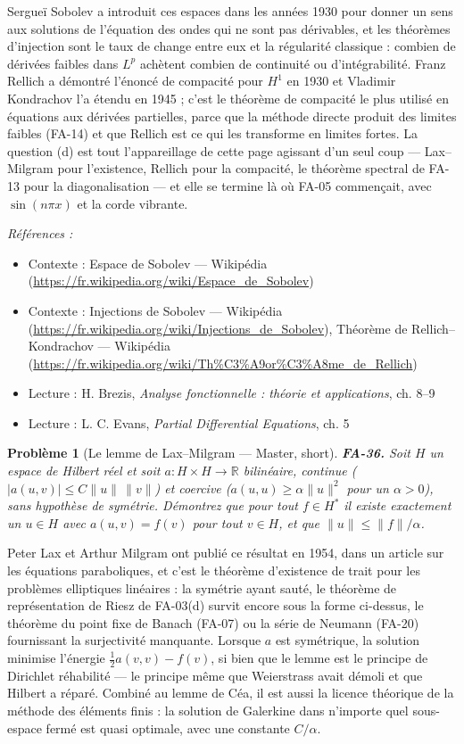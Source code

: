 \documentclass[11pt]{article}
\newtheorem{problem}{Problème}
\newenvironment{refs}{\par\small\noindent\emph{Références :}\begin{itemize}\setlength\itemsep{0pt}}{\end{itemize}\normalsize}
\begin{document}
\noindent Sergueï Sobolev a introduit ces espaces dans les années 1930 pour donner un sens aux
solutions de l'équation des ondes qui ne sont pas dérivables, et les théorèmes d'injection sont le taux de
change entre eux et la régularité classique : combien de dérivées faibles dans $ L^p $ achètent combien
de continuité ou d'intégrabilité. Franz Rellich a démontré l'énoncé de compacité pour $ H^1 $ en 1930 et
Vladimir Kondrachov l'a étendu en 1945 ; c'est le théorème de compacité le plus utilisé en équations aux
dérivées partielles, parce que la méthode directe produit des limites faibles (FA-14) et que Rellich est ce
qui les transforme en limites fortes. La question (d) est tout l'appareillage de cette page agissant d'un
seul coup --- Lax--Milgram pour l'existence, Rellich pour la compacité, le théorème spectral de FA-13 pour la
diagonalisation --- et elle se termine là où FA-05 commençait, avec $ \sin(n\pi x) $ et la corde
vibrante.

\begin{refs}
\item Contexte : Espace de Sobolev --- Wikipédia (\url{https://fr.wikipedia.org/wiki/Espace_de_Sobolev})
\item Contexte : Injections de Sobolev --- Wikipédia (\url{https://fr.wikipedia.org/wiki/Injections_de_Sobolev}), Théorème de Rellich--Kondrachov --- Wikipédia (\url{https://fr.wikipedia.org/wiki/Th%C3%A9or%C3%A8me_de_Rellich})
\item Lecture : H. Brezis, \textit{Analyse fonctionnelle : théorie et applications}, ch. 8--9
\item Lecture : L. C. Evans, \textit{Partial Differential Equations}, ch. 5
\end{refs}

\bigskip

\begin{problem}[{Le lemme de Lax--Milgram --- Master, short}]
\textbf{FA-36.} Soit $ H $ un espace de Hilbert réel et soit
$ a : H \times H \to \mathbb{R} $ bilinéaire, continue ($ |a(u,v)| \le C\|u\|\,\|v\| $) et coercive
($ a(u,u) \ge \alpha \|u\|^2 $ pour un $ \alpha > 0 $), sans hypothèse de symétrie. Démontrez que
pour tout $ f \in H^{*} $ il existe exactement un $ u \in H $ avec $ a(u,v) = f(v) $ pour tout
$ v \in H $, et que $ \|u\| \le \|f\|/\alpha $.
\end{problem}

\noindent Peter Lax et Arthur Milgram ont publié ce résultat en 1954, dans un article sur les
équations paraboliques, et c'est le théorème d'existence de trait pour les problèmes elliptiques
linéaires : la symétrie ayant sauté, le théorème de représentation de Riesz de FA-03(d) survit encore sous
la forme ci-dessus, le théorème du point fixe de Banach (FA-07) ou la série de Neumann (FA-20) fournissant
la surjectivité manquante. Lorsque $ a $ est symétrique, la solution minimise l'énergie
$ \tfrac{1}{2}a(v,v) - f(v) $, si bien que le lemme est le principe de Dirichlet réhabilité --- le
principe même que Weierstrass avait démoli et que Hilbert a réparé. Combiné au lemme de Céa, il est aussi
la licence théorique de la méthode des éléments finis : la solution de Galerkine dans n'importe quel
sous-espace fermé est quasi optimale, avec une constante $ C/\alpha $.
\end{document}
